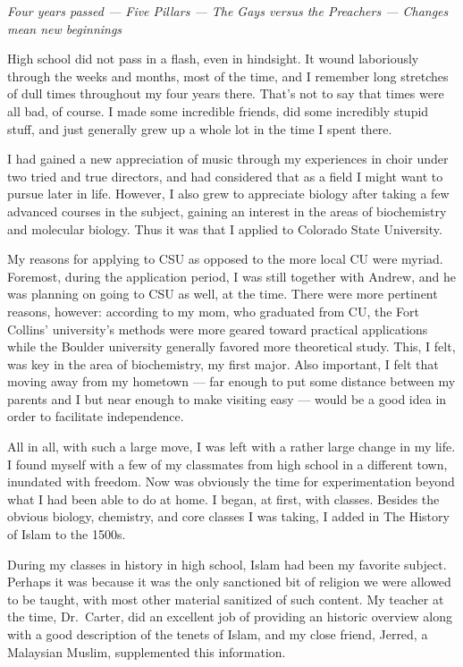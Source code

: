\emph{Four years passed --- Five Pillars --- The Gays versus the Preachers --- Changes mean new beginnings}

High school did not pass in a flash, even in hindsight. It wound laboriously through the weeks and months, most of the time, and I remember long stretches of dull times throughout my four years there. That's not to say that times were all bad, of course. I made some incredible friends, did some incredibly stupid stuff, and just generally grew up a whole lot in the time I spent there.

I had gained a new appreciation of music through my experiences in choir under two tried and true directors, and had considered that as a field I might want to pursue later in life. However, I also grew to appreciate biology after taking a few advanced courses in the subject, gaining an interest in the areas of biochemistry and molecular biology. Thus it was that I applied to Colorado State University.

My reasons for applying to CSU as opposed to the more local CU were myriad. Foremost, during the application period, I was still together with Andrew, and he was planning on going to CSU as well, at the time. There were more pertinent reasons, however: according to my mom, who graduated from CU, the Fort Collins' university's methods were more geared toward practical applications while the Boulder university generally favored more theoretical study. This, I felt, was key in the area of biochemistry, my first major. Also important, I felt that moving away from my hometown --- far enough to put some distance between my parents and I but near enough to make visiting easy --- would be a good idea in order to facilitate independence.

All in all, with such a large move, I was left with a rather large change in my life. I found myself with a few of my classmates from high school in a different town, inundated with freedom. Now was obviously the time for experimentation beyond what I had been able to do at home. I began, at first, with classes. Besides the obvious biology, chemistry, and core classes I was taking, I added in The History of Islam to the 1500s.

During my classes in history in high school, Islam had been my favorite subject. Perhaps it was because it was the only sanctioned bit of religion we were allowed to be taught, with most other material sanitized of such content. My teacher at the time, Dr.~Carter, did an excellent job of providing an historic overview along with a good description of the tenets of Islam, and my close friend, Jerred, a Malaysian Muslim, supplemented this information.

